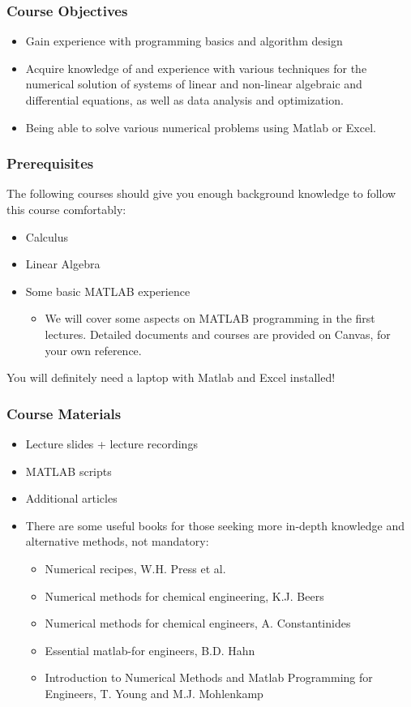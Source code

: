 \begin{frame}
 \frametitle{Course Objectives}
 \begin{itemize}
  \item Gain experience with programming basics and algorithm design
  \item Acquire knowledge of and experience with various techniques for the numerical solution of systems of linear and non-linear algebraic and differential equations, as well as data analysis and optimization.
  \item Being able to solve various numerical problems using Matlab or Excel. 
 \end{itemize}
\end{frame}

\begin{frame}
 \frametitle{Prerequisites}
  The following courses should give you enough background knowledge to follow this course comfortably:
 \begin{itemize}
   \item Calculus
   \item Linear Algebra
   \item Some basic MATLAB experience
     \begin{itemize}
       \item We will cover some aspects on MATLAB programming in the first lectures. Detailed documents and courses are provided on Canvas, for your own reference.
     \end{itemize}
    \end{itemize}
    You will definitely need a laptop with Matlab and Excel installed!
\end{frame}

\begin{frame}
 \frametitle{Course Materials}
 \begin{itemize}
  \item Lecture slides + lecture recordings
  \item MATLAB scripts
  \item Additional articles
  \item There are some useful books for those seeking more in-depth knowledge and alternative methods, not mandatory:
  \begin{itemize}
    \item Numerical recipes, W.H. Press et al.
    \item Numerical methods for chemical engineering, K.J. Beers
    \item Numerical methods for chemical engineers, A. Constantinides
    \item Essential matlab-for engineers, B.D. Hahn
    \item Introduction to Numerical Methods and Matlab Programming for Engineers, T. Young and M.J. Mohlenkamp
  \end{itemize}
 \end{itemize}
\end{frame}

